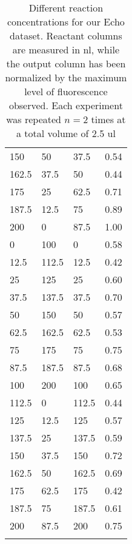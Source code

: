 \begin{longtable}{lll | l}
150      & 50    & 37.5  & 0.54 \\
162.5    & 37.5  & 50    & 0.44 \\
175      & 25    & 62.5  & 0.71 \\
187.5    & 12.5  & 75    & 0.89 \\
200      & 0     & 87.5  & 1.00 \\
0        & 100   & 0     & 0.58 \\
12.5     & 112.5 & 12.5  & 0.42 \\
25       & 125   & 25    & 0.60 \\
37.5     & 137.5 & 37.5  & 0.70 \\
50       & 150   & 50    & 0.57 \\
62.5     & 162.5 & 62.5  & 0.53 \\
75       & 175   & 75    & 0.75 \\
87.5     & 187.5 & 87.5  & 0.68 \\
100      & 200   & 100   & 0.65 \\
112.5    & 0     & 112.5 & 0.44 \\
125      & 12.5  & 125   & 0.57 \\
137.5    & 25    & 137.5 & 0.59 \\
150      & 37.5  & 150   & 0.72 \\
162.5    & 50    & 162.5 & 0.69 \\
175      & 62.5  & 175   & 0.42 \\
187.5    & 75    & 187.5 & 0.61 \\
200      & 87.5  & 200   & 0.75 \\
\caption[Different reaction concentrations for our Echo dataset]{Different reaction concentrations for our Echo dataset.
Reactant columns are measured in \gls{nl}, while the output column has been normalized by the maximum level of fluorescence observed.
Each experiment was repeated $n = 2$ times at a total volume of 2.5 \gls{ul}}
\label{tab:echo}
\end{longtable}